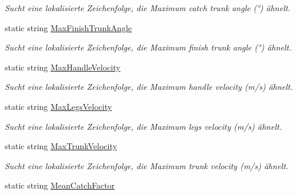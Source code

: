 \begin{DoxyCompactItemize}
\begin{DoxyCompactList}\small\item\em Sucht eine lokalisierte Zeichenfolge, die Maximum catch trunk angle (°) ähnelt. \end{DoxyCompactList}\item 
static string \hyperlink{class_rowing_monitor_1_1_properties_1_1_resources_ab2e04d859eccef5e7fe84566c5d19a9e}{Max\+Finish\+Trunk\+Angle}
\begin{DoxyCompactList}\small\item\em Sucht eine lokalisierte Zeichenfolge, die Maximum finish trunk angle (°) ähnelt. \end{DoxyCompactList}\item 
static string \hyperlink{class_rowing_monitor_1_1_properties_1_1_resources_ae64ee05cc7efe5061d819604243cc329}{Max\+Handle\+Velocity}
\begin{DoxyCompactList}\small\item\em Sucht eine lokalisierte Zeichenfolge, die Maximum handle velocity (m/s) ähnelt. \end{DoxyCompactList}\item 
static string \hyperlink{class_rowing_monitor_1_1_properties_1_1_resources_a1be32a40d9aabe3ccd2a5e2a4c13c5e6}{Max\+Legs\+Velocity}
\begin{DoxyCompactList}\small\item\em Sucht eine lokalisierte Zeichenfolge, die Maximum legs velocity (m/s) ähnelt. \end{DoxyCompactList}\item 
static string \hyperlink{class_rowing_monitor_1_1_properties_1_1_resources_a55adc5e7b70ad437f1d5cc217fd3e799}{Max\+Trunk\+Velocity}
\begin{DoxyCompactList}\small\item\em Sucht eine lokalisierte Zeichenfolge, die Maximum trunk velocity (m/s) ähnelt. \end{DoxyCompactList}\item 
static string \hyperlink{class_rowing_monitor_1_1_properties_1_1_resources_afd9d96b64031744615932ca371e64257}{Mean\+Catch\+Factor}

\end{DoxyCompactItemize}
